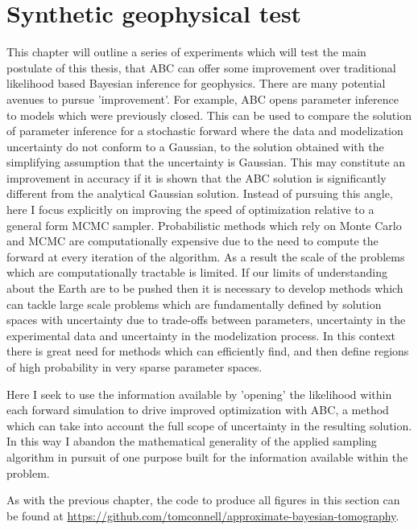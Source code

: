 \chapter{Synthetic geophysical test}

This chapter will outline a series of experiments which will test the main postulate of this thesis, that ABC can offer some improvement over traditional likelihood based Bayesian inference for geophysics. There are many potential avenues to pursue 'improvement'. For example, ABC opens parameter inference to models which were previously closed. This can be used to compare the solution of parameter inference for a stochastic forward where the data and modelization uncertainty do not conform to a Gaussian, to the solution obtained with the simplifying assumption that the uncertainty is Gaussian. This may constitute an improvement in accuracy if it is shown that the ABC solution is significantly different from the analytical Gaussian solution. Instead of pursuing this angle, here I focus explicitly on improving the speed of optimization relative to a general form MCMC sampler. Probabilistic methods which rely on Monte Carlo and MCMC are computationally expensive due to the need to compute the forward at every iteration of the algorithm. As a result the scale of the problems which are computationally tractable is limited. If our limits of understanding about the Earth are to be pushed then it is necessary to develop methods which can tackle large scale problems which are fundamentally defined by solution spaces with uncertainty due to trade-offs between parameters, uncertainty in the experimental data and uncertainty in the modelization process. In this context there is great need for methods which can efficiently find, and then define regions of high probability in very sparse parameter spaces. \par

Here I seek to use the information available by 'opening' the likelihood within each forward simulation to drive improved optimization with ABC, a method which can take into account the full scope of uncertainty in the resulting solution. In this way I abandon the mathematical generality of the applied sampling algorithm in pursuit of one purpose built for the information available within the problem. \par

As with the previous chapter, the code to produce all figures in this section can be found at \url{https://github.com/tomconnell/approximate-bayesian-tomography}.\par


